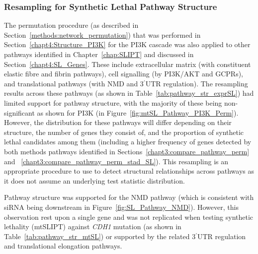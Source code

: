 \FloatBarrier

\subsubsection{Resampling for Synthetic Lethal Pathway Structure}  \label{chapt4:Structure_Perm}

The permutation procedure (as described in Section~\ref{methods:network_permutation}) that was performed in Section~\ref{chapt4:Structure_PI3K} for the \gls{PI3K} cascade was also applied to other pathways identified in Chapter~\ref{chap:SLIPT} and discussed in Section~\ref{chapt4:SL_Genes}. These include extracellular matrix (with constituent elastic fibre and fibrin pathways), cell signalling (by PI3K/AKT and GCPRs), and translational pathways (with \gls{NMD} and 3$^\prime$\gls{UTR} regulation). The resampling results across these pathways (as shown in Table~\ref{tab:pathway_str_exprSL}) had limited support for pathway structure, with the majority of these being non-significant as shown for PI3K (in Figure~\ref{fig:mtSL_Pathway_PI3K_Perm}). However, the distribution for these pathways will differ depending on their structure, the number of genes they consist of, and the proportion of synthetic lethal candidates among them (including a higher frequency of genes detected by both methods pathways identified in Sections~\ref{chapt3:compare_pathway_perm} and ~\ref{chapt3:compare_pathway_perm_stad_SL}). This resampling is an appropriate procedure to use to detect structural relationships across pathways as it does not assume an underlying test statistic distribution.

Pathway structure was supported for the \gls{NMD} pathway (which is consistent with \gls{siRNA} being downstream in Figure~\ref{fig:SL_Pathway_NMD}). However, this observation rest upon a single gene and was not replicated when testing synthetic lethality (mtSLIPT) against \textit{CDH1} mutation (as shown in Table~\ref{tab:pathway_str_mtSL}) or supported by the related 3$^\prime$\gls{UTR} regulation and translational elongation pathways.

